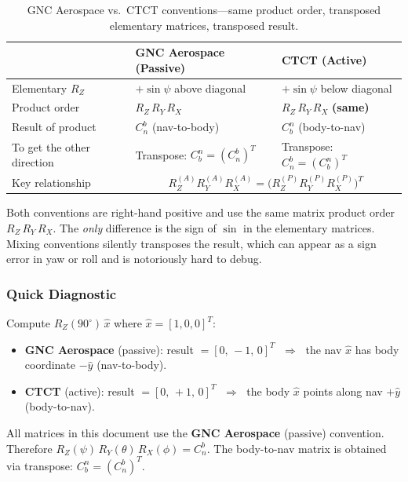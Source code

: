 \documentclass[12pt,a4paper]{article}
\begin{document}
\begin{table}[h]
\centering
\begin{tabular}{@{}p{3.8cm}p{5cm}p{5cm}@{}}
\toprule
 & \textbf{GNC Aerospace (Passive)} & \textbf{CTCT (Active)} \\
\midrule
Elementary $R_Z$ &
  $+\sin\psi$ above diagonal &
  $+\sin\psi$ below diagonal \\[4pt]
Product order &
  $R_Z\, R_Y\, R_X$ &
  $R_Z\, R_Y\, R_X$ \textbf{(same)} \\[4pt]
Result of product &
  $C_n^b$ (nav-to-body) &
  $C_b^n$ (body-to-nav) \\[4pt]
To get the other direction &
  Transpose: $C_b^n = (C_n^b)^T$ &
  Transpose: $C_n^b = (C_b^n)^T$ \\[4pt]
Key relationship &
  \multicolumn{2}{c}{$R_Z^{(A)} R_Y^{(A)} R_X^{(A)}
  = \bigl(R_Z^{(P)} R_Y^{(P)} R_X^{(P)}\bigr)^T$} \\
\bottomrule
\end{tabular}
\caption{GNC Aerospace vs.\ CTCT conventions---same product order,
transposed elementary matrices, transposed result.}
\end{table}

\begin{warningbox}
Both conventions are right-hand positive and use the same matrix product
order $R_Z\,R_Y\,R_X$. The \emph{only} difference is the sign of $\sin$ in
the elementary matrices. Mixing conventions silently transposes the result,
which can appear as a sign error in yaw or roll and is notoriously hard to
debug.
\end{warningbox}

\subsubsection*{Quick Diagnostic}

Compute $R_Z(90^\circ)\,\hat{x}$ where $\hat{x}=[1,0,0]^T$:
\begin{itemize}
  \item \textbf{GNC Aerospace} (passive): result $= [0,\,-1,\,0]^T$
        $\;\Rightarrow\;$ the nav $\hat{x}$ has body coordinate $-\hat{y}$
        (nav-to-body).
  \item \textbf{CTCT} (active): result $= [0,\,+1,\,0]^T$
        $\;\Rightarrow\;$ the body $\hat{x}$ points along nav $+\hat{y}$
        (body-to-nav).
\end{itemize}

\begin{keybox}
All matrices in this document use the \textbf{GNC Aerospace} (passive)
convention. Therefore $R_Z(\psi)\,R_Y(\theta)\,R_X(\phi) = C_n^b$.
The body-to-nav matrix is obtained via transpose: $C_b^n = (C_n^b)^T$.
\end{keybox}
\end{document}
